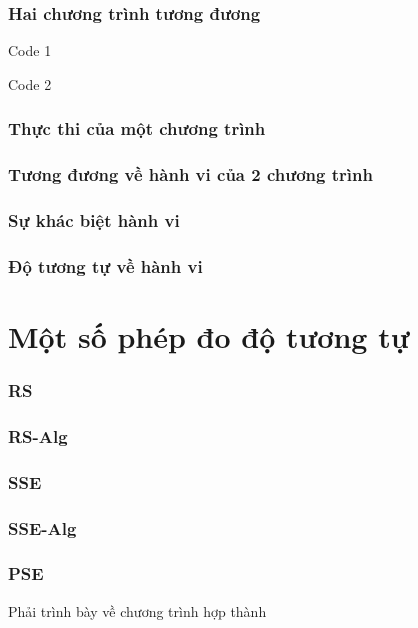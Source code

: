 \documentclass{beamer}
\begin{document}
\begin{frame}
  \frametitle{Hai chương trình tương đương}
  \begin{minipage}{0.45\linewidth}
    Code 1
  \end{minipage}
  \hfill
  \begin{minipage}{0.45\linewidth}
    Code 2
  \end{minipage}
\end{frame}


\begin{frame}
  \frametitle{Thực thi của một chương trình}
  
\end{frame}


\begin{frame}
  \frametitle{Tương đương về hành vi của 2 chương trình}
  
\end{frame}


\begin{frame}
  \frametitle{Sự khác biệt hành vi}
  
\end{frame}


\begin{frame}
  \frametitle{Độ tương tự về hành vi}
  
\end{frame}


\section{Một số phép đo độ tương tự}

\begin{frame}
  \frametitle{RS}
  
\end{frame}


\begin{frame}
  \frametitle{RS-Alg}
  
\end{frame}


\begin{frame}
  \frametitle{SSE}
  
\end{frame}


\begin{frame}
  \frametitle{SSE-Alg}
  
\end{frame}


\begin{frame}
  \frametitle{PSE}
  Phải trình bày về chương trình hợp thành
\end{frame}
\end{document}
